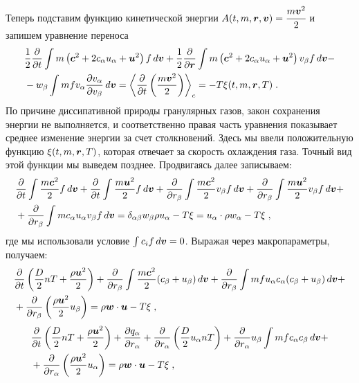 Теперь подставим функцию кинетической энергии $A(t,m,\bm{r},\bm{v})=\cfrac{m\bm{v}^2}{2}$ и запишем уравнение переноса
\begin{equation}
  \begin{split}
    &\frac{1}{2}\frac{\partial}{\partial t}\int m\left(\bm{c}^2+2c_\alpha u_\alpha + \bm{u}^2\right)f\,d\bm{v}
    + \frac{1}{2}\frac{\partial}{\partial\bm{r}}\int m\left(\bm{c}^2+2c_\alpha u_\alpha + \bm{u}^2\right)v_\beta f\,d\bm{v}-\\
    &-w_\beta\int mfv_\alpha\frac{\partial v_\alpha}{\partial v_\beta}\,d\bm{v}=\left\langle\frac{\partial}{\partial t}\left(\frac{m\bm{v}^2}{2}\right)\right\rangle_c=
    -T\xi(t,m,\bm{r},T)\;.\\
  \end{split}
\end{equation}
По причине диссипативной природы гранулярных газов, закон сохранения энергии не выполняется, и соответственно правая часть уравнения показывает
среднее изменение энергии за счет столкновений. Здесь мы ввели положительную функцию $\xi(t,m,\bm{r},T)$, которая отвечает за скорость
охлаждения газа. Точный вид этой функции мы выведем позднее. Продвигаясь далее записываем:
\begin{equation}
  \begin{split}
    &\frac{\partial}{\partial t}\int\frac{m\bm{c}^2}{2}f\,d\bm{v}+\frac{\partial}{\partial t}\int\frac{m\bm{u}^2}{2}f\,d\bm{v}+
    \frac{\partial}{\partial r_\beta}\int\frac{m\bm{c}^2}{2}v_\beta f\,d\bm{v} + \frac{\partial}{\partial r_\beta}\int\frac{m\bm{u}^2}{2}v_\beta f\,d\bm{v} + \\
    &+\frac{\partial}{\partial r_\beta}\int mc_\alpha u_\alpha v_\beta f\,d\bm{v} = \delta_{\alpha\beta}w_\beta\rho u_\alpha - T\xi = u_\alpha\cdot\rho w_\alpha - T\xi\;,
  \end{split}
\end{equation}
где мы использовали условие $\int c_if\,d\bm{v}=0$. Выражая через макропараметры, получаем:
\begin{equation}
  \begin{split}
    &\frac{\partial}{\partial t}\left(\frac{D}{2}nT+\frac{\rho\bm{u}^2}{2}\right)+\frac{\partial}{\partial r_\beta}\int\frac{m\bm{c}^2}{2}(c_\beta+u_\beta)\,d\bm{v} +
    \frac{\partial}{\partial r_\beta}\int mfu_\alpha c_\alpha(c_\beta+u_\beta)\,d\bm{v} +\\
    &+\frac{\partial}{\partial r_\beta}\left(\frac{\rho\bm{u}^2}{2}u_\beta\right)=\rho\bm{w}\cdot\bm{u}-T\xi\;,
  \end{split}
\end{equation}
\begin{equation}
  \begin{split}
    &\frac{\partial}{\partial t}\left(\frac{D}{2}nT+\frac{\rho\bm{u}^2}{2}\right)+\frac{\partial q_\alpha}{\partial r_\alpha}+
    \frac{\partial}{\partial r_\alpha}\left(\frac{D}{2}u_\alpha nT\right)+\frac{\partial}{\partial r_\alpha}u_\beta\int mfc_\alpha c_\beta\,d\bm{v}+\\
    &+\frac{\partial}{\partial r_\alpha}\left(\frac{\rho\bm{u}^2}{2}u_\alpha\right)=\rho\bm{w}\cdot\bm{u}-T\xi\;,
  \end{split}
\end{equation}
